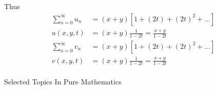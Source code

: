 \documentclass[]{article}
\begin{document}
Thus
\begin{align*}
    \sum_{n=0}^{\infty} u_n &=(x+y)\left[ 1+(2t) + (2t)^2 + \dots \right] \\
    u(x,y,t) &=(x+y)\frac{1}{1-2t} = \frac{x+y}{1-2t}\\
    \sum_{n=0}^{\infty} v_n &=(x+y)\left[ 1+(2t) + (2t)^2 + \dots \right] \\
    v(x,y,t) &=(x+y)\frac{1}{1-2t} = \frac{x+y}{1-2t}\\
\end{align*}
















\begingroup
\newpage
{}
\thispagestyle{empty}
\color{cover}
\begin{center}
    {
    \fontsize{20pt}{0}\handfont \color{white}
    Selected Topics In Pure Mathematics
    }
\end{center}
\end{document}
